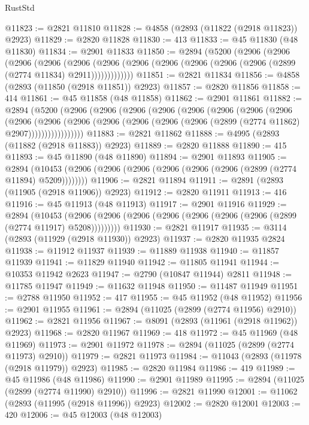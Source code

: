 \begin{lexlean}{RustStd}
\begin{coremodule}
@11823 := @2821 @11810
@11828 := @4858 (@2893 (@11822 (@2918 @11823)) @2923)
@11829 := @2820 @11828
@11830 := 413
@11833 := @45 @11830 (@48 @11830)
@11834 := @2901 @11833
@11850 := @2894
    (@5200
      (@2906
        (@2906
          (@2906
            (@2906
              (@2906
                (@2906 (@2906 (@2906 (@2906 (@2906 (@2906 (@2899 (@2774 @11834) @2911)))))))))))))
@11851 := @2821 @11834
@11856 := @4858 (@2893 (@11850 (@2918 @11851)) @2923)
@11857 := @2820 @11856
@11858 := 414
@11861 := @45 @11858 (@48 @11858)
@11862 := @2901 @11861
@11882 := @2894
    (@5200
      (@2906
        (@2906
          (@2906
            (@2906
              (@2906
                (@2906
                  (@2906
                    (@2906
                      (@2906
                        (@2906
                          (@2906
                            (@2906 (@2906 (@2906 (@2906 (@2899 (@2774 @11862) @2907)))))))))))))))))
@11883 := @2821 @11862
@11888 := @4995 (@2893 (@11882 (@2918 @11883)) @2923)
@11889 := @2820 @11888
@11890 := 415
@11893 := @45 @11890 (@48 @11890)
@11894 := @2901 @11893
@11905 := @2894
    (@10453 (@2906 (@2906 (@2906 (@2906 (@2906 (@2906 (@2899 (@2774 @11894) @5209))))))))
@11906 := @2821 @11894
@11911 := @2891 (@2893 (@11905 (@2918 @11906)) @2923)
@11912 := @2820 @11911
@11913 := 416
@11916 := @45 @11913 (@48 @11913)
@11917 := @2901 @11916
@11929 := @2894
    (@10453 (@2906 (@2906 (@2906 (@2906 (@2906 (@2906 (@2906 (@2899 (@2774 @11917) @5208)))))))))
@11930 := @2821 @11917
@11935 := @3114 (@2893 (@11929 (@2918 @11930)) @2923)
@11937 := @2820 @11935 @2824
@11938 := @11912 @11937
@11939 := @11889 @11938
@11940 := @11857 @11939
@11941 := @11829 @11940
@11942 := @11805 @11941
@11944 := @10353 @11942 @2623
@11947 := @2790 (@10847 @11944) @2811
@11948 := @11785 @11947
@11949 := @11632 @11948
@11950 := @11487 @11949
@11951 := @2788 @11950
@11952 := 417
@11955 := @45 @11952 (@48 @11952)
@11956 := @2901 @11955
@11961 := @2894 (@11025 (@2899 (@2774 @11956) @2910))
@11962 := @2821 @11956
@11967 := @8091 (@2893 (@11961 (@2918 @11962)) @2923)
@11968 := @2820 @11967
@11969 := 418
@11972 := @45 @11969 (@48 @11969)
@11973 := @2901 @11972
@11978 := @2894 (@11025 (@2899 (@2774 @11973) @2910))
@11979 := @2821 @11973
@11984 := @11043 (@2893 (@11978 (@2918 @11979)) @2923)
@11985 := @2820 @11984
@11986 := 419
@11989 := @45 @11986 (@48 @11986)
@11990 := @2901 @11989
@11995 := @2894 (@11025 (@2899 (@2774 @11990) @2910))
@11996 := @2821 @11990
@12001 := @11062 (@2893 (@11995 (@2918 @11996)) @2923)
@12002 := @2820 @12001
@12003 := 420
@12006 := @45 @12003 (@48 @12003)

\end{coremodule}
\end{lexlean}
